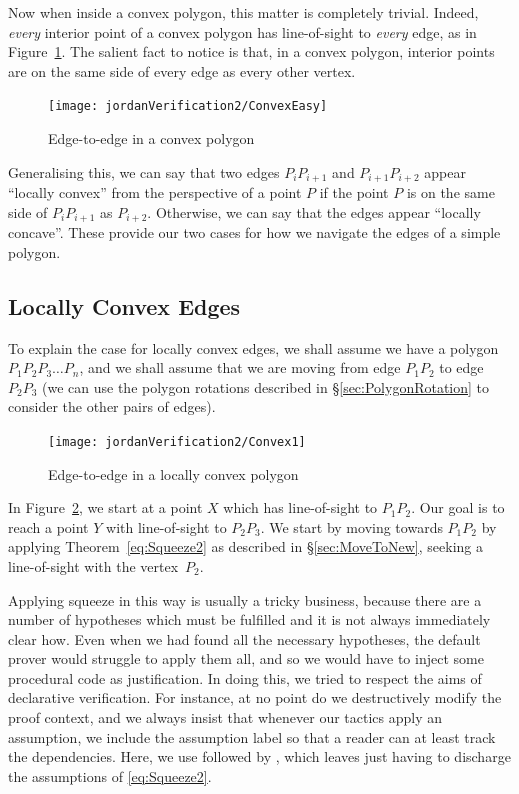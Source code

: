 Now when inside a convex polygon, this matter is completely trivial. Indeed, \emph{every} interior point of a convex polygon has line-of-sight to \emph{every} edge, as in Figure~\ref{fig:ConvexEasy}. The salient fact to notice is that, in a convex polygon, interior points are on the same side of every edge as every other vertex. 

\begin{figure}
\centering\texttt{[image: jordanVerification2/ConvexEasy]}
\caption{Edge-to-edge in a convex polygon}
\label{fig:ConvexEasy}
\end{figure}

Generalising this, we can say that two edges $P_{i}P_{i+1}$ and $P_{i+1}P_{i+2}$ appear ``locally convex'' from the perspective of a point $P$ if the point $P$ is on the same side of $P_{i}P_{i+1}$ as $P_{i+2}$. Otherwise, we can say that the edges appear ``locally concave''. These provide our two cases for how we navigate the edges of a simple polygon.

\subsection{Locally Convex Edges}\label{sec:ConcaveMove}
To explain the case for locally convex edges, we shall assume we have a polygon $P_1P_2P_3\ldots P_n$, and we shall assume that we are moving from edge $P_1P_2$ to edge $P_2P_3$ (we can use the polygon rotations described in \S\ref{sec:PolygonRotation} to consider the other pairs of edges).

\begin{figure}
\centering\texttt{[image: jordanVerification2/Convex1]}
\caption{Edge-to-edge in a locally convex polygon}
\label{fig:Convex1}
\end{figure}

In Figure~\ref{fig:Convex1}, we start at a point $X$ which has line-of-sight to $P_1P_2$. Our goal is to reach a point $Y$ with line-of-sight to $P_2P_3$. We start by moving towards $P_1P_2$ by applying Theorem~\ref{eq:Squeeze2} as described in \S\ref{sec:MoveToNew}, seeking a line-of-sight with the vertex~$P_2$. 

\label{sec:InjectingProcedural}Applying squeeze in this way is usually a tricky business, because there are a number of hypotheses which must be fulfilled and it is not always immediately clear how. Even when we had found all the necessary hypotheses, the default  prover would struggle to apply them all, and so we would have to inject some procedural code as justification. In doing this, we tried to respect the aims of declarative verification. For instance, at no point do we destructively modify the proof context, and we always insist that whenever our tactics apply an assumption, we include the assumption label so that a reader can at least track the dependencies. Here, we use  followed by , which leaves  just having to discharge the assumptions of \eqref{eq:Squeeze2}.

